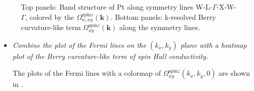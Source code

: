 \begin{figure}[htb!]
\centering
{}\qquad
{}
\caption{Top panels: Band structure of Pt along symmetry lines W-L-$\Gamma$-X-W-$\Gamma$, colored by
the $\Omega_{n,xy}^{\text{spin}z}({\bm k})$. 
Bottom panels: k-resolved Berry curvature-like term $\Omega_{xy}^{\text{spin}z}(\bm k)$ along the symmetry lines.}
\label{fig29.1}
\end{figure}
\clearpage

\begin{itemize}
	\item {\it Combine the plot of the Fermi lines on the $(k_x,k_y)$ plane with a heatmap plot of the Berry curvature-like term of spin Hall conductivity.}

	The plots of the Fermi lines with a colormap of $\Omega_{xy}^{\text{spin}z}(k_x,k_y,0)$ are shown in .
\end{itemize}

